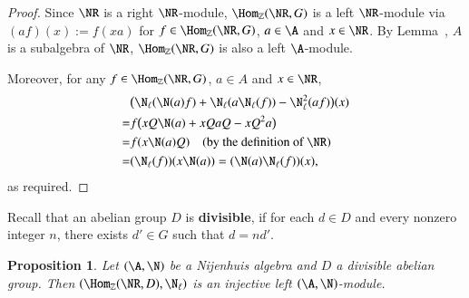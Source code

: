 \documentclass[12pt]{amsart}
\newtheorem{prop}[theorem]{Proposition}
\theoremstyle{definition}
\begin{document}
\begin{proof}
Since $\NR$ is a right $\NR$-module, $\Hom_{\mathbb{Z}}(\NR, G)$ is a left $\NR$-module via $(af)(x):=f(xa)$ for $f \in \Hom_{\mathbb{Z}}(\NR, G)$, $a \in \A$ and $x \in \NR$. By Lemma~, $A$ is a subalgebra of $\NR$, $\Hom_{\mathbb{Z}}(\NR, G)$ is also a left $\A$-module. 

Moreover, for any $f \in \Hom_{\mathbb{Z}}(\NR, G)$, $a \in A$ and $x \in \NR$,
\begin{align*}
& \big( \N_{\ell}(\N(a)f)+\N_{\ell}(a \N_{\ell}(f))-\N_{\ell}^2(af) \big)(x)\\
=& f \big(x Q \N(a)+x QaQ-xQ^2a \big)\\
=& f(x \N(a) Q) \quad \text{(by the definition of $\NR$)}\\
=& (\N_{\ell}(f))(x \N(a))=(\N(a) \N_{\ell}(f))(x),
\end{align*}
as required.
\end{proof}

Recall that an abelian group $D$ is {\bf divisible}, if for each $d\in D$ and every nonzero integer $n$, there exists $d' \in G$ such that $d=nd'$.

\begin{prop}
Let $(\A,\N)$ be a Nijenhuis algebra and $D$ a divisible abelian group. Then $(\Hom_{\mathbb{Z}}(\NR,D),\N_{\ell})$ is an injective left $(\A,\N)$-module.
\end{prop}
\end{document}
